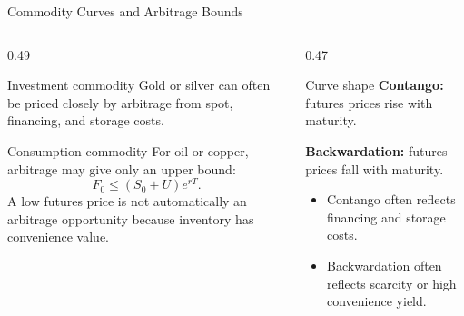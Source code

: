\documentclass[aspectratio=169,11pt]{beamer}
\begin{document}
\begin{frame}{Commodity Curves and Arbitrage Bounds}
    \begin{columns}[T]
        \begin{column}{0.49\textwidth}
            \begin{block}{Investment commodity}
                Gold or silver can often be priced closely by arbitrage from spot, financing, and storage costs.
            \end{block}

            \begin{block}{Consumption commodity}
                For oil or copper, arbitrage may give only an upper bound:
                \[
                    F_0\leq (S_0+U)e^{rT}.
                \]
                A low futures price is not automatically an arbitrage opportunity because inventory has convenience value.
            \end{block}
        \end{column}
        \begin{column}{0.47\textwidth}
            \begin{block}{Curve shape}
                \textbf{Contango:} futures prices rise with maturity.

                \vspace{0.4em}
                \textbf{Backwardation:} futures prices fall with maturity.
            \end{block}

            \begin{itemize}
                \item Contango often reflects financing and storage costs.
                \item Backwardation often reflects scarcity or high convenience yield.
            \end{itemize}
        \end{column}
    \end{columns}
\end{frame}
\end{document}
